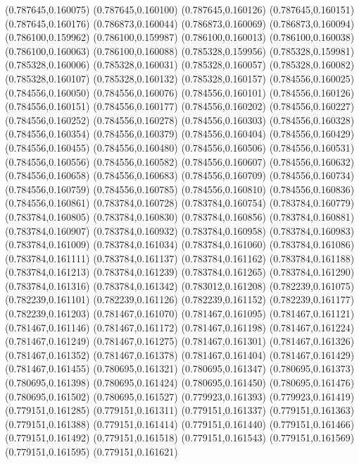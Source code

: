 (0.787645,0.160075)
(0.787645,0.160100)
(0.787645,0.160126)
(0.787645,0.160151)
(0.787645,0.160176)
(0.786873,0.160044)
(0.786873,0.160069)
(0.786873,0.160094)
(0.786100,0.159962)
(0.786100,0.159987)
(0.786100,0.160013)
(0.786100,0.160038)
(0.786100,0.160063)
(0.786100,0.160088)
(0.785328,0.159956)
(0.785328,0.159981)
(0.785328,0.160006)
(0.785328,0.160031)
(0.785328,0.160057)
(0.785328,0.160082)
(0.785328,0.160107)
(0.785328,0.160132)
(0.785328,0.160157)
(0.784556,0.160025)
(0.784556,0.160050)
(0.784556,0.160076)
(0.784556,0.160101)
(0.784556,0.160126)
(0.784556,0.160151)
(0.784556,0.160177)
(0.784556,0.160202)
(0.784556,0.160227)
(0.784556,0.160252)
(0.784556,0.160278)
(0.784556,0.160303)
(0.784556,0.160328)
(0.784556,0.160354)
(0.784556,0.160379)
(0.784556,0.160404)
(0.784556,0.160429)
(0.784556,0.160455)
(0.784556,0.160480)
(0.784556,0.160506)
(0.784556,0.160531)
(0.784556,0.160556)
(0.784556,0.160582)
(0.784556,0.160607)
(0.784556,0.160632)
(0.784556,0.160658)
(0.784556,0.160683)
(0.784556,0.160709)
(0.784556,0.160734)
(0.784556,0.160759)
(0.784556,0.160785)
(0.784556,0.160810)
(0.784556,0.160836)
(0.784556,0.160861)
(0.783784,0.160728)
(0.783784,0.160754)
(0.783784,0.160779)
(0.783784,0.160805)
(0.783784,0.160830)
(0.783784,0.160856)
(0.783784,0.160881)
(0.783784,0.160907)
(0.783784,0.160932)
(0.783784,0.160958)
(0.783784,0.160983)
(0.783784,0.161009)
(0.783784,0.161034)
(0.783784,0.161060)
(0.783784,0.161086)
(0.783784,0.161111)
(0.783784,0.161137)
(0.783784,0.161162)
(0.783784,0.161188)
(0.783784,0.161213)
(0.783784,0.161239)
(0.783784,0.161265)
(0.783784,0.161290)
(0.783784,0.161316)
(0.783784,0.161342)
(0.783012,0.161208)
(0.782239,0.161075)
(0.782239,0.161101)
(0.782239,0.161126)
(0.782239,0.161152)
(0.782239,0.161177)
(0.782239,0.161203)
(0.781467,0.161070)
(0.781467,0.161095)
(0.781467,0.161121)
(0.781467,0.161146)
(0.781467,0.161172)
(0.781467,0.161198)
(0.781467,0.161224)
(0.781467,0.161249)
(0.781467,0.161275)
(0.781467,0.161301)
(0.781467,0.161326)
(0.781467,0.161352)
(0.781467,0.161378)
(0.781467,0.161404)
(0.781467,0.161429)
(0.781467,0.161455)
(0.780695,0.161321)
(0.780695,0.161347)
(0.780695,0.161373)
(0.780695,0.161398)
(0.780695,0.161424)
(0.780695,0.161450)
(0.780695,0.161476)
(0.780695,0.161502)
(0.780695,0.161527)
(0.779923,0.161393)
(0.779923,0.161419)
(0.779151,0.161285)
(0.779151,0.161311)
(0.779151,0.161337)
(0.779151,0.161363)
(0.779151,0.161388)
(0.779151,0.161414)
(0.779151,0.161440)
(0.779151,0.161466)
(0.779151,0.161492)
(0.779151,0.161518)
(0.779151,0.161543)
(0.779151,0.161569)
(0.779151,0.161595)
(0.779151,0.161621)
